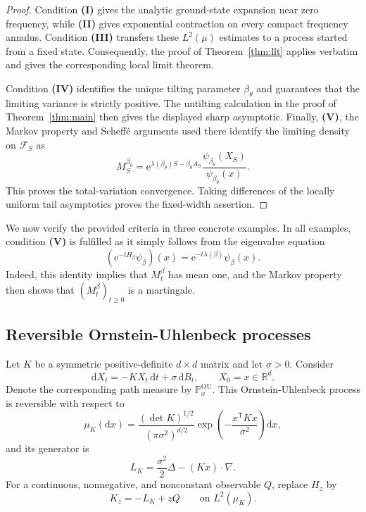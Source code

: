 \documentclass[11pt,reqno]{amsart}
\theoremstyle{definition}
\numberwithin{equation}{section}
\newcommand{\<}{\langle}
\renewcommand{\>}{\rangle}
\def\de{{\rm d}}
\def\de{{\mathrm {d}}}
\def\bbP{{\mathbb{P}}}
\begin{document}
\begin{proof}
Condition \textbf{(I)} gives the analytic ground-state expansion near
zero frequency, while \textbf{(II)} gives exponential contraction on
every compact frequency annulus.  Condition \textbf{(III)} transfers
these $L^2(\mu)$ estimates to a process started from a fixed state.
Consequently, the proof of Theorem~\ref{thm:llt} applies verbatim and
gives the corresponding local limit theorem.

Condition \textbf{(IV)} identifies the unique tilting parameter
$\beta_\theta$ and guarantees that the limiting variance is strictly
positive.  The untilting calculation in the proof of
Theorem~\ref{thm:main} then gives the displayed sharp asymptotic.
Finally, \textbf{(V)}, the Markov property and Scheff\'e arguments used there identify
the limiting density on $\mathcal F_S$ as
\[
    M_S^{\beta_\theta}
      =\mathrm e^{\lambda(\beta_\theta)S-\beta_\theta A_S}
        \frac{\psi_{\beta_\theta}(X_S)}
             {\psi_{\beta_\theta}(x)}.
\]
This proves the total-variation convergence.  Taking differences of the
locally uniform tail asymptotics proves the fixed-width assertion.
\end{proof}


We now verify the provided
criteria in three concrete examples. In all examples, condition \textbf{(V)} is fulfilled as it simply follows from the eigenvalue equation
\[(\mathrm e^{-tH_\beta}\psi_\beta)(x) = \mathrm e^{-t\lambda(\beta)}\psi_\beta(x).\]
Indeed, this identity implies that $M_t ^\beta$ has mean one, and the Markov property then shows that $(M_t ^\beta)_{t \ge 0}$ is a martingale.

\subsection{Reversible Ornstein-Uhlenbeck processes}
\label{rem:ou-extension}
Let $K$ be a symmetric positive-definite $d\times d$ matrix and let
$\sigma>0$.  Consider
\[
    \de X_t=-KX_t\,\de t+\sigma\,\de B_t,
    \qquad X_0=x\in\mathbb R^d.
\]
Denote the corresponding path measure by $\bbP_x^{\mathrm{OU}}$.  This
Ornstein-Uhlenbeck process is reversible with respect to
\[
    \mu_K(\de x)
      =\frac{(\det K)^{1/2}}{(\pi\sigma^2)^{d/2}}
        \exp\!\left(-\frac{x^{\mathsf T}Kx}{\sigma^2}\right)\de x,
\]
and its generator is
\[
    L_K=\frac{\sigma^2}{2}\Delta-(Kx)\cdot\nabla.
\]
For a continuous, nonnegative, and nonconstant observable $Q$, replace
$H_z$ by
\[
    K_z=-L_K+zQ
    \qquad\text{on }L^2(\mu_K).
\]
\end{document}
